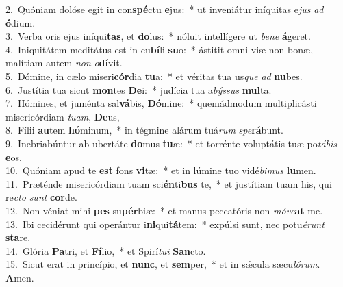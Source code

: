 {2.~}Quóniam dolóse egit in con\textbf{spé}ctu \textbf{e}jus:~* ut inveniátur iníquitas e\textit{jus} \textit{ad} \textbf{ó}dium.\\
{3.~}Verba oris ejus iníqui\textbf{tas}, et \textbf{do}lus:~* nóluit intellígere ut \textit{be}\textit{ne} \textbf{á}geret.\\
{4.~}Iniquitátem meditátus est in cu\textbf{bí}li \textbf{su}o:~* ástitit omni viæ non bonæ, malítiam autem \textit{non} \textit{o}\textbf{dí}vit.\\
{5.~}Dómine, in cælo miseri\textbf{cór}dia \textbf{tu}a:~* et véritas tua us\textit{que} \textit{ad} \textbf{nu}bes.\\
{6.~}Justítia tua sicut \textbf{mon}tes \textbf{De}i:~* judícia tua a\textit{býs}\textit{sus} \textbf{mul}ta.\\
{7.~}Hómines, et juménta sal\textbf{vá}bis, \textbf{Dó}mine:~* quemádmodum multiplicásti misericórdiam \textit{tu}\textit{am}, \textbf{De}us,\\
{8.~}Fílii \textbf{au}tem \textbf{hó}minum,~* in tégmine alárum tuá\textit{rum} \textit{spe}\textbf{rá}bunt.\\
{9.~}Inebriabúntur ab ubertáte \textbf{do}mus \textbf{tu}æ:~* et torrénte voluptátis tuæ po\textit{tá}\textit{bis} \textbf{e}os.\\
{10.~}Quóniam apud te \textbf{est} fons \textbf{vi}tæ:~* et in lúmine tuo vidé\textit{bi}\textit{mus} \textbf{lu}men.\\
{11.~}Præténde misericórdiam tuam sci\textbf{én}ti\textbf{bus} te,~* et justítiam tuam his, qui re\textit{cto} \textit{sunt} \textbf{cor}de.\\
{12.~}Non véniat mihi \textbf{pes} su\textbf{pér}biæ:~* et manus peccatóris non \textit{mó}\textit{ve}\textbf{at} me.\\
{13.~}Ibi cecidérunt qui operántur i\textbf{ni}qui\textbf{tá}tem:~* expúlsi sunt, nec potu\textit{é}\textit{runt} \textbf{sta}re.\\
{14.~}Glória \textbf{Pa}tri, et \textbf{Fí}lio,~* et Spirí\textit{tu}\textit{i} \textbf{San}cto.\\
{15.~}Sicut erat in princípio, et \textbf{nunc}, et \textbf{sem}per,~* et in sǽcula sæcu\textit{ló}\textit{rum}. \textbf{A}men.\\
